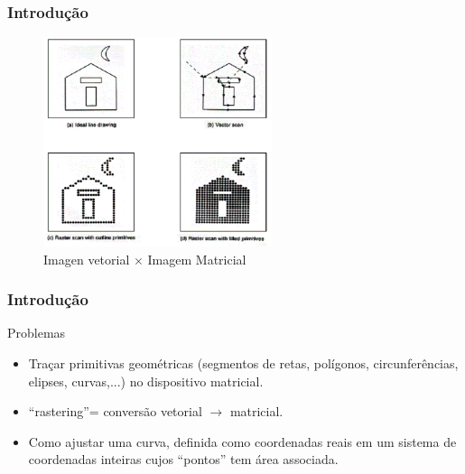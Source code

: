 \documentclass{beamer}
\begin{document}
\begin{frame}
\frametitle{Introdução}

		\begin{figure}[!h]
			\begin{center}
			\includegraphics[width=0.6\textwidth]{Figures/IMG}
			\caption{Imagen vetorial $\times$ Imagem Matricial}
			\end{center}
		\end{figure}
	
\end{frame}



\begin{frame}
\frametitle{Introdução}

		\begin{block}{Problemas}
		\begin{itemize}
			\item Traçar primitivas geométricas (segmentos de retas, polígonos, circunferências, elipses, curvas,...) no dispositivo matricial.
			\item ``rastering''= conversão vetorial $\to$ matricial.
			
			\item Como ajustar uma curva, definida como coordenadas reais em um sistema de coordenadas inteiras cujos ``pontos'' tem área associada. 						 
		\end{itemize}
	\end{block}
	
\end{frame}
\end{document}
